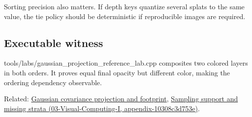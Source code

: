 Sorting precision also matters. If depth keys quantize several splats to the same value, the tie policy should be deterministic if reproducible images are required.

\subsection{Executable witness}\label{executable-witness}

tools/labs/gaussian\_projection\_reference\_lab.cpp composites two colored layers in both orders. It proves equal final opacity but different color, making the ordering dependency observable.

Related: \hyperref[appendix-24269cb6977c]{Gaussian covariance projection and footprint}, \href{}{Sampling support and missing strata (03-Visual-Computing-I, appendix-10308c3d753e)}.
